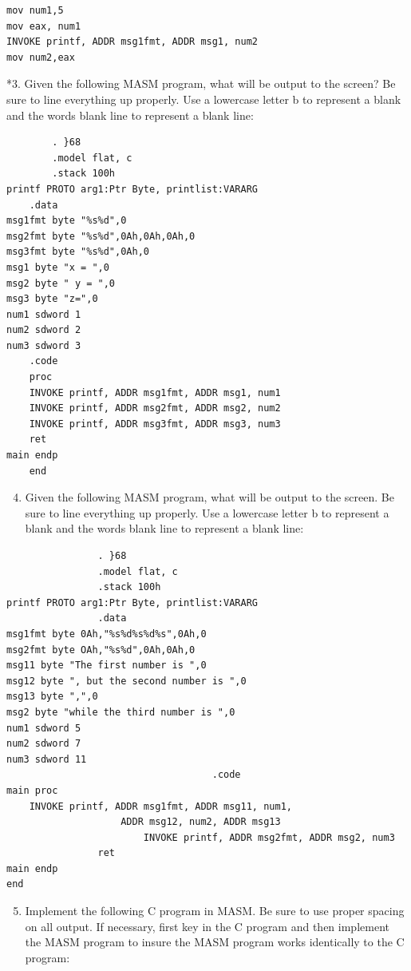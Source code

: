\documentclass[10pt]{article}
\begin{document}
\begin{verbatim}
mov num1,5
mov eax, num1
INVOKE printf, ADDR msg1fmt, ADDR msg1, num2
mov num2,eax
\end{verbatim}

*3. Given the following MASM program, what will be output to the screen? Be sure to line everything up properly. Use a lowercase letter b to represent a blank and the words blank line to represent a blank line:

\begin{verbatim}
        . }68
        .model flat, c
        .stack 100h
printf PROTO arg1:Ptr Byte, printlist:VARARG
    .data
msg1fmt byte "%s%d",0
msg2fmt byte "%s%d",0Ah,0Ah,0Ah,0
msg3fmt byte "%s%d",0Ah,0
msg1 byte "x = ",0
msg2 byte " y = ",0
msg3 byte "z=",0
num1 sdword 1
num2 sdword 2
num3 sdword 3
    .code
    proc
    INVOKE printf, ADDR msg1fmt, ADDR msg1, num1
    INVOKE printf, ADDR msg2fmt, ADDR msg2, num2
    INVOKE printf, ADDR msg3fmt, ADDR msg3, num3
    ret
main endp
    end
\end{verbatim}

\begin{enumerate}
  \setcounter{enumi}{3}
  \item Given the following MASM program, what will be output to the screen. Be sure to line everything up properly. Use a lowercase letter b to represent a blank and the words blank line to represent a blank line:
\end{enumerate}

\begin{verbatim}
                . }68
                .model flat, c
                .stack 100h
printf PROTO arg1:Ptr Byte, printlist:VARARG
                .data
msg1fmt byte 0Ah,"%s%d%s%d%s",0Ah,0
msg2fmt byte OAh,"%s%d",0Ah,0Ah,0
msg11 byte "The first number is ",0
msg12 byte ", but the second number is ",0
msg13 byte ",",0
msg2 byte "while the third number is ",0
num1 sdword 5
num2 sdword 7
num3 sdword 11
                                    .code
main proc
    INVOKE printf, ADDR msg1fmt, ADDR msg11, num1,
                    ADDR msg12, num2, ADDR msg13
                        INVOKE printf, ADDR msg2fmt, ADDR msg2, num3
                ret
main endp
end
\end{verbatim}

\begin{enumerate}
  \setcounter{enumi}{4}
  \item Implement the following C program in MASM. Be sure to use proper spacing on all output. If necessary, first key in the C program and then implement the MASM program to insure the MASM program works identically to the C program:
\end{enumerate}
\end{document}
